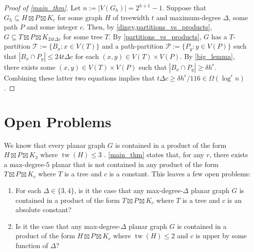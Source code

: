 \documentclass{patmorin}
\DeclareMathOperator{\tw}{tw}
\begin{document}
\begin{proof}[Proof of \cref{main_thm}]
  Let $n:=|V(G_h)|=2^{h+1}-1$.  Suppose that $G_h\subseteq H\boxtimes P\boxtimes K_c$ for some graph $H$ of treewidth $t$ and maximum-degree $\Delta$, some path $P$ and some integer $c$.  Then, by \cref{dingy,partitions_vs_products}, $G\subseteq T\boxtimes P\boxtimes K_{24t\Delta c}$ for some tree $T$.  By \cref{partitions_vs_products}, $G$ has a $T$-partition $\mathcal{T}:=\{B_x:x\in V(T)\}$ and a path-partition $\mathcal{P}:=\{P_y:y\in V(P)\}$ such that $|B_x\cap P_y|\le 24t\Delta c$ for each $(x,y)\in V(T)\times V(P)$.  By \cref{big_lemma}, there exists some $(x,y)\in V(T)\times V(P)$ such that $|B_x\cap P_y| \ge \delta h^\epsilon$.  Combining these latter two equations implies that $t\Delta c\ge \delta h^\epsilon/116 \in \Omega(\log^\epsilon n)$.  
\end{proof}



\section{Open Problems}

We know that every planar graph $G$ is contained in a product of the form $H\boxtimes P\boxtimes K_3$ where $\tw(H)\le 3$ \cite{dujmovic.joret.ea:planar}. \cref{main_thm} states that, for any $r$, there exists a max-degree-$5$ planar that is not contained in any product of the form $T\boxtimes P\boxtimes K_c$ where $T$ is a tree and $c$ is a constant.  This leaves a few open problems:

\begin{enumerate}
  \item For each $\Delta\in\{3,4\}$, is it the case that any max-degree-$\Delta$ planar graph $G$ is contained in a product of the form $T\boxtimes P\boxtimes K_c$ where $T$ is a tree and $c$ is an absolute constant?

  \item Is it the case that any max-degree-$\Delta$ planar graph $G$ is contained in a product of the form $H\boxtimes P\boxtimes K_c$ where $\tw(H)\le 2$ and $c$ is upper by some function of $\Delta$?
\end{enumerate}




\end{document}
